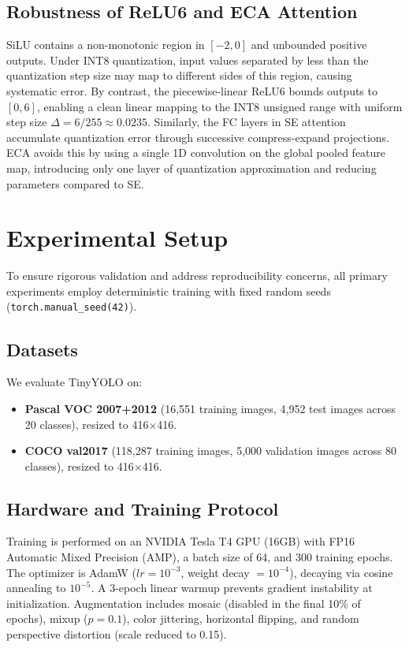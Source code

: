 \documentclass[journal]{IEEEtran}
\begin{document}
\subsection{Robustness of ReLU6 and ECA Attention}
SiLU contains a non-monotonic region in $[-2, 0]$ and unbounded positive outputs. Under INT8 quantization, input values separated by less than the quantization step size may map to different sides of this region, causing systematic error. By contrast, the piecewise-linear ReLU6 bounds outputs to $[0, 6]$, enabling a clean linear mapping to the INT8 unsigned range with uniform step size $\Delta = 6/255 \approx 0.0235$. Similarly, the FC layers in SE attention accumulate quantization error through successive compress-expand projections. ECA avoids this by using a single 1D convolution on the global pooled feature map, introducing only one layer of quantization approximation and reducing parameters compared to SE.

\section{Experimental Setup}
To ensure rigorous validation and address reproducibility concerns, all primary experiments employ deterministic training with fixed random seeds (\texttt{torch.manual\_seed(42)}).

\subsection{Datasets}
We evaluate TinyYOLO on:
\begin{itemize}
\item \textbf{Pascal VOC 2007+2012} (16,551 training images, 4,952 test images across 20 classes), resized to 416$\times$416.
\item \textbf{COCO val2017} (118,287 training images, 5,000 validation images across 80 classes), resized to 416$\times$416.
\end{itemize}

\subsection{Hardware and Training Protocol}
Training is performed on an NVIDIA Tesla T4 GPU (16GB) with FP16 Automatic Mixed Precision (AMP), a batch size of 64, and 300 training epochs. The optimizer is AdamW ($lr=10^{-3}$, weight decay $=10^{-4}$), decaying via cosine annealing to $10^{-5}$. A 3-epoch linear warmup prevents gradient instability at initialization. Augmentation includes mosaic (disabled in the final 10\% of epochs), mixup ($p=0.1$), color jittering, horizontal flipping, and random perspective distortion (scale reduced to 0.15).
\end{document}

